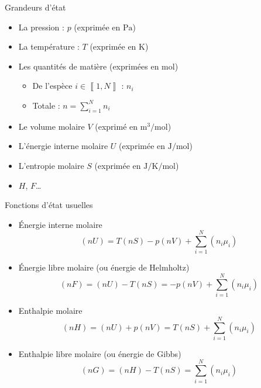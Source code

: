 \documentclass[
  ignorenonframetext,
]{beamer}
\providecommand{\tightlist}{%
  \setlength{\itemsep}{0pt}\setlength{\parskip}{0pt}}
\begin{document}
\begin{frame}{Grandeurs d'état}
\protect\hypertarget{grandeurs-duxe9tat}{}
\begin{itemize}
\item
  La pression : \(p\) (exprimée en \(\si{\pascal}\))
\item
  La température : \(T\) (exprimée en \(\si{\kelvin}\))
\item
  Les quantités de matière (exprimées en \(\si{\mole}\))

  \begin{itemize}
  \tightlist
  \item
    De l'espèce \(i \in \left \llbracket 1, N \right \rrbracket\) :
    \(n _ i\)
  \item
    Totale : \(n = \sum _ {i = 1} ^ N n _ i\)
  \end{itemize}
\item
  Le volume molaire \(V\) (exprimé en \(\si{\meter\cubed\per\mole}\))
\item
  L'énergie interne molaire \(U\) (exprimée en \(\si{\joule\per\mole}\))
\item
  L'entropie molaire \(S\) (exprimée en
  \(\si{\joule\per\kelvin\per\mole}\))
\item
  \(H\), \(F\)\ldots{}
\end{itemize}
\end{frame}

\begin{frame}{Fonctions d'état usuelles}
\protect\hypertarget{fonctions-duxe9tat-usuelles}{}
\begin{itemize}
\tightlist
\item
  Énergie interne molaire \[
  \left ( n U \right ) = T \left ( n S \right ) - p \left ( n V \right ) + \sum _ {i = 1} ^ N \left ( n _ i \mu _ i \right )
  \]
\item
  Énergie libre molaire (ou énergie de Helmholtz) \[
  \left ( n F \right ) = \left ( n U \right ) - T \left ( n S \right ) = - p \left ( n V \right ) + \sum _ {i = 1} ^ N \left ( n _ i \mu _ i \right )
  \]
\item
  Enthalpie molaire \[
  \left ( n H \right ) = \left ( n U \right ) + p \left ( n V \right ) = T \left ( n S \right ) + \sum _ {i = 1} ^ N \left ( n _ i \mu _ i \right )
  \]
\item
  Enthalpie libre molaire (ou énergie de Gibbs) \[
  \left ( n G \right ) = \left ( n H \right ) - T \left ( n S \right ) = \sum _ {i = 1} ^ N \left ( n _ i \mu _ i \right )
  \]
\end{itemize}
\end{frame}
\end{document}

